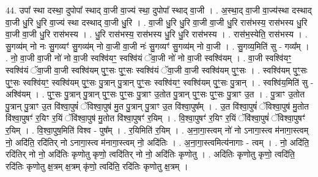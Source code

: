 \documentclass[17pt]{extarticle}
\begin{document}
44. उपा᳚ स्था दस्था॒ दुपोपा᳚ स्थाद् वा॒जी वा॒ज्य॑ स्था॒ दुपोपा᳚ स्थाद् वा॒जी । . अ॒स्था॒द् वा॒जी वा॒ज्य॑स्था दस्थाद् वा॒जी धु॒रि धु॒रि वा॒ज्य॑ स्था दस्थाद् वा॒जी धु॒रि । . वा॒जी धु॒रि धु॒रि वा॒जी वा॒जी धु॒रि रास॑भस्य॒ रास॑भस्य धु॒रि वा॒जी वा॒जी धु॒रि रास॑भस्य । . धु॒रि रास॑भस्य॒ रास॑भस्य धु॒रि धु॒रि रास॑भस्य । . रास॑भ॒स्येति॒ रास॑भस्य । . सु॒गव्य॑म् नो नः सु॒गव्यꣳ॑ सु॒गव्य॑म् नो वा॒जी वा॒जी नः॑ सु॒गव्यꣳ॑ सु॒गव्य॑म् नो वा॒जी । . सु॒गव्य॒मिति॑ सु - गव्य᳚म् । . नो॒ वा॒जी वा॒जी नो॑ नो वा॒जी स्वश्वि॑यꣳ॒॒ स्वश्वि॑यं ॅवा॒जी नो॑ नो वा॒जी स्वश्वि॑यम् । . वा॒जी स्वश्वि॑यꣳ॒॒ स्वश्वि॑यं ॅवा॒जी वा॒जी स्वश्वि॑यम् पुꣳ॒॒सः पुꣳ॒॒सः स्वश्वि॑यं ॅवा॒जी वा॒जी स्वश्वि॑यम् पुꣳ॒॒सः । . स्वश्वि॑यम् पुꣳ॒॒सः पुꣳ॒॒सः स्वश्वि॑यꣳ॒॒ स्वश्वि॑यम् पुꣳ॒॒सः पु॒त्रान् पु॒त्रान् पुꣳ॒॒सः स्वश्वि॑यꣳ॒॒ स्वश्वि॑यम् पुꣳ॒॒सः पु॒त्रान् । . स्वश्वि॑य॒मिति॑ सु - अश्वि॑यम् । . पुꣳ॒॒सः पु॒त्रान् पु॒त्रान् पुꣳ॒॒सः पुꣳ॒॒सः पु॒त्राꣳ उ॒तोत पु॒त्रान् पुꣳ॒॒सः पुꣳ॒॒सः पु॒त्राꣳ उ॒त । . पु॒त्राꣳ उ॒तोत पु॒त्रान् पु॒त्राꣳ उ॒त वि॑श्वा॒पुषं॑ ॅविश्वा॒पुष॑ मु॒त पु॒त्रान् पु॒त्राꣳ उ॒त वि॑श्वा॒पुष᳚म् । . उ॒त वि॑श्वा॒पुषं॑ ॅविश्वा॒पुष॑ मु॒तोत वि॑श्वा॒पुषꣳ॑ र॒यिꣳ र॒यिं ॅवि॑श्वा॒पुष॑ मु॒तोत वि॑श्वा॒पुषꣳ॑ र॒यिम् । . वि॒श्वा॒पुषꣳ॑ र॒यिꣳ र॒यिं ॅवि॑श्वा॒पुषं॑ ॅविश्वा॒पुषꣳ॑ र॒यिम् । . वि॒श्वा॒पुष॒मिति॑ विश्व - पुष᳚म् । . र॒यिमिति॑ र॒यिम् । . अ॒ना॒गा॒स्त्वम् नो॑ नो ऽनागा॒स्त्व म॑नागा॒स्त्वम् नो॒ अदि॑ति॒ रदि॑तिर् नो ऽनागा॒स्त्व म॑नागा॒स्त्वम् नो॒ अदि॑तिः । . अ॒ना॒गा॒स्त्वमित्य॑नागाः - त्वम् । . नो॒ अदि॑ति॒ रदि॑तिर् नो नो॒ अदि॑तिः कृणोतु कृणो॒ त्वदि॑तिर् नो नो॒ अदि॑तिः कृणोतु । . अदि॑तिः कृणोतु कृणो॒ त्वदि॑ति॒ रदि॑तिः कृणोतु क्ष॒त्रम् क्ष॒त्रम् कृ॑णो॒ त्वदि॑ति॒ रदि॑तिः कृणोतु क्ष॒त्रम् । \newline
\end{document}
